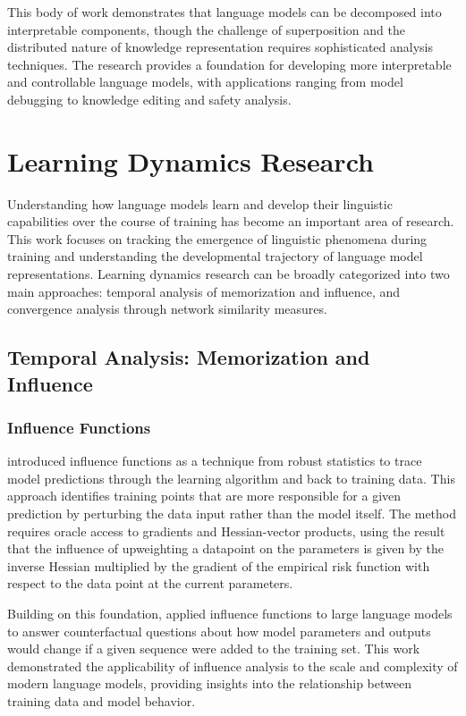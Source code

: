 This body of work demonstrates that language models can be decomposed into interpretable components, though the challenge of superposition and the distributed nature of knowledge representation requires sophisticated analysis techniques. The research provides a foundation for developing more interpretable and controllable language models, with applications ranging from model debugging to knowledge editing and safety analysis.

\section{Learning Dynamics Research}

Understanding how language models learn and develop their linguistic capabilities over the course of training has become an important area of research. This work focuses on tracking the emergence of linguistic phenomena during training and understanding the developmental trajectory of language model representations. Learning dynamics research can be broadly categorized into two main approaches: temporal analysis of memorization and influence, and convergence analysis through network similarity measures.

\subsection{Temporal Analysis: Memorization and Influence}

\subsubsection{Influence Functions}

\citet{koh2017understanding} introduced influence functions as a technique from robust statistics to trace model predictions through the learning algorithm and back to training data. This approach identifies training points that are more responsible for a given prediction by perturbing the data input rather than the model itself. The method requires oracle access to gradients and Hessian-vector products, using the result that the influence of upweighting a datapoint on the parameters is given by the inverse Hessian multiplied by the gradient of the empirical risk function with respect to the data point at the current parameters.

Building on this foundation, \citet{grosse2023influence} applied influence functions to large language models to answer counterfactual questions about how model parameters and outputs would change if a given sequence were added to the training set. This work demonstrated the applicability of influence analysis to the scale and complexity of modern language models, providing insights into the relationship between training data and model behavior.

